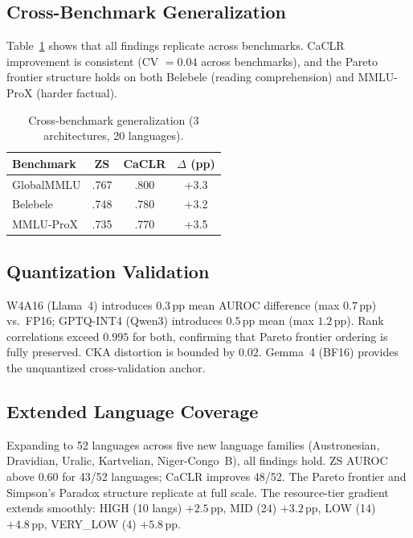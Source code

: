 \documentclass[11pt,a4paper]{article}
\newcommand{\pp}{\,\text{pp}}
\newcommand{\caclr}{CaCLR}
\begin{document}
\subsection{Cross-Benchmark Generalization}

Table~\ref{tab:crossbench} shows that all findings replicate across benchmarks.
\caclr{} improvement is consistent (CV $= 0.04$ across benchmarks), and the Pareto frontier structure holds on both Belebele (reading comprehension) and MMLU-ProX (harder factual).

\begin{table}[t]
\centering
\small
\begin{tabular}{@{}lccc@{}}
\toprule
\textbf{Benchmark} & \textbf{ZS} & \textbf{\caclr{}} & $\Delta$ (pp) \\
\midrule
GlobalMMLU & .767 & .800 & +3.3 \\
Belebele & .748 & .780 & +3.2 \\
MMLU-ProX & .735 & .770 & +3.5 \\
\bottomrule
\end{tabular}
\caption{Cross-benchmark generalization (3 architectures, 20 languages).}
\label{tab:crossbench}
\end{table}

\subsection{Quantization Validation}
\label{sec:quant}

W4A16 (Llama~4) introduces $0.3\pp$ mean AUROC difference (max $0.7\pp$) vs.\ FP16; GPTQ-INT4 (Qwen3) introduces $0.5\pp$ mean (max $1.2\pp$).
Rank correlations exceed $0.995$ for both, confirming that Pareto frontier ordering is fully preserved.
CKA distortion is bounded by $0.02$.
Gemma~4 (BF16) provides the unquantized cross-validation anchor.

\subsection{Extended Language Coverage}
\label{sec:extended}

Expanding to 52 languages across five new language families (Austronesian, Dravidian, Uralic, Kartvelian, Niger-Congo~B), all findings hold.
ZS AUROC above $0.60$ for 43/52 languages; \caclr{} improves 48/52.
The Pareto frontier and Simpson's Paradox structure replicate at full scale.
The resource-tier gradient extends smoothly: HIGH (10 langs) $+2.5\pp$, MID (24) $+3.2\pp$, LOW (14) $+4.8\pp$, VERY\_LOW (4) $+5.8\pp$.
\end{document}
